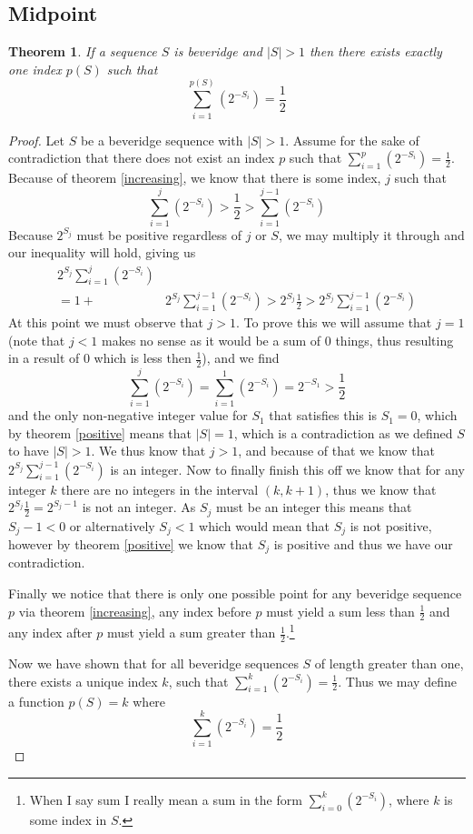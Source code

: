 \documentclass{macjourn}
\def\useLim{}
\newcommand{\sumfrom}[3]{\sum\useLim_{#1}^{#2} \left( {#3} \right)}
\newcommand{\cardinality}[1]{\left| #1 \right|}
\newcommand{\ooint}[2]{\left( #1 , #2 \right)}
\newtheorem{theorem}{Theorem}[subsection]
\theoremstyle{definition}
\begin{document}
	
	\subsection{Midpoint}
	
	
	\begin{theorem}	\label{one}
		If a sequence $S$ is beveridge and $\cardinality{S} > 1$ then there exists exactly one index $p(S)$ such that \[\sumfrom{i=1}{p(S)}{2^{-S_i}} = \frac12\]
	\end{theorem}
	\begin{proof}
		Let $S$ be a beveridge sequence with $\cardinality{S} > 1$. Assume for the sake of contradiction that there does not exist an index $p$ such that $\sumfrom{i=1}{p}{2^{-S_i}} = \frac12$. Because of theorem \ref{increasing}, we know that there is some index, $j$ such that \[\sumfrom{i=1}{j}{2^{-S_i}} > \frac12 > \sumfrom{i=1}{j-1}{2^{-S_i}}\] Because $2^{S_j}$ must be positive regardless of $j$ or $S$, we may multiply it through and our inequality will hold, giving us
		\begin{align*}
			2^{S_j}\sumfrom{i=1}{j}{2^{-S_i}}& \\
			= 1 + &2^{S_j}\sumfrom{i=1}{j-1}{2^{-S_i}}
			> 2^{S_j}\frac12 
			> 2^{S_j}\sumfrom{i=1}{j-1}{2^{-S_i}}
		\end{align*} 
		At this point we must observe that $j > 1$. To prove this we will assume that $j = 1$ (note that $j < 1$ makes no sense as it would be a sum of $0$ things, thus resulting in a result of $0$ which is less then $\frac12$), and we find
		\[
		\sumfrom{i=1}{j}{2^{-S_i}} = \sumfrom{i=1}{1}{2^{-S_i}} = 2^{-S_1} > \frac12
		\]
		and the only non-negative integer value for $S_1$ that satisfies this is $S_1 = 0$, which by theorem \ref{positive} means that $\cardinality{S} = 1$, which is a contradiction as we defined $S$ to have $\cardinality{S} > 1$. We thus know that $j > 1$, and because of that we know that $2^{S_j}\sumfrom{i=1}{j-1}{2^{-S_i}}$ is an integer. Now to finally finish this off we know that for any integer $k$ there are no integers in the interval $\ooint k{k+1}$, thus we know that $2^{S_j}\frac12 = 2^{S_j-1}$ is not an integer. As $S_j$ must be an integer this means that $S_j - 1 < 0$ or alternatively $S_j < 1$ which would mean that $S_j$ is not positive, however by theorem \ref{positive} we know that $S_j$ is positive and thus we have our contradiction.
		
		Finally we notice that there is only one possible point for any beveridge sequence $p$ via theorem \ref{increasing}, any index before $p$ must yield a sum less than $\frac12$ and any index after $p$ must yield a sum greater than $\frac12$.\footnote{When I say sum I really mean a sum in the form $\sumfrom{i=0}{k}{2^{-S_i}}$, where $k$ is some index in $S$.}
		
		Now we have shown that for all beveridge sequences $S$ of length greater than one, there exists a unique index $k$, such that $\sumfrom{i=1}{k}{2^{-S_i}} = \frac12$. Thus we may define a function $p(S) = k$ where \[\sumfrom{i=1}{k}{2^{-S_i}} = \frac12\]
	\end{proof}
	
\end{document}
